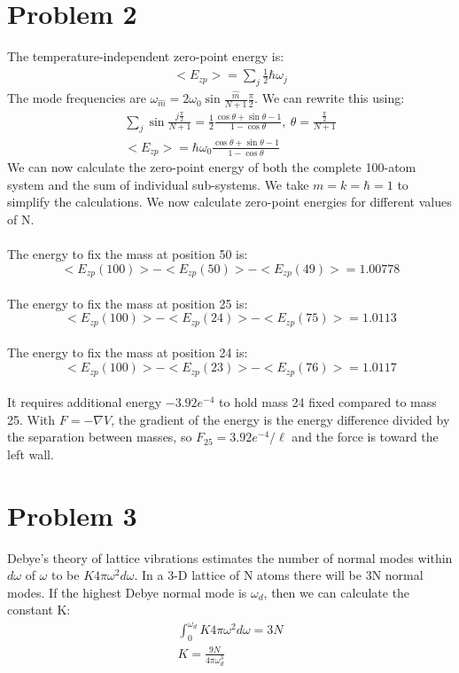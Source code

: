 \documentclass[a4paper,10pt]{article}
\numberwithin{equation}{section}
\begin{document}
\section{Problem 2}
The temperature-independent zero-point energy is:
\begin{gather}
  <E_{zp}>=\sum_j \frac{1}{2}\hbar \omega_j
\end{gather}
The mode frequencies are $\omega_{\hat{m}}=2\omega_0\sin{\frac{\hat{m}}{N+1}\frac{\pi}{2}}$. We can rewrite this using:
\begin{gather}
 \sum_j\sin\frac{j\frac{\pi}{2}}{N+1}=\frac{1}{2}\frac{\cos \theta+\sin \theta-1}{1-\cos \theta},\ \theta=\frac{\frac{\pi}{2}}{N+1}\\
 <E_{zp}>=\hbar\omega_0\frac{\cos \theta+\sin \theta-1}{1-\cos \theta}
\end{gather}
We can now calculate the zero-point energy of both the complete 100-atom system and the sum of individual sub-systems.
We take $m=k=\hbar=1$ to simplify the calculations. We now calculate zero-point energies for different values of N.\\ \\
The energy to fix the mass at position 50 is:
\begin{equation}
 <E_{zp}(100)>-<E_{zp}(50)>-<E_{zp}(49)>=1.00778
\end{equation}
\\
The energy to fix the mass at position 25 is:
\begin{equation}
 <E_{zp}(100)>-<E_{zp}(24)>-<E_{zp}(75)>=1.0113
\end{equation}
\\ 
The energy to fix the mass at position 24 is:
\begin{equation}
 <E_{zp}(100)>-<E_{zp}(23)>-<E_{zp}(76)>=1.0117
\end{equation}
\\
It requires additional energy $-3.92e^{-4}$ to hold mass 24 fixed compared to mass 25. 
With $F=-\nabla V$, the gradient of the energy is the energy difference divided by the separation between masses, so $F_{25}=3.92e^{-4}/\ell$ and the force is toward the left wall.

\section{Problem 3}
Debye's theory of lattice vibrations estimates the number of normal modes within $d\omega$ of $\omega$ to be $K4\pi\omega ^2 d\omega$.
In a 3-D lattice of N atoms there will be 3N normal modes. If the highest Debye normal mode is $\omega_d$, then we can calculate the constant K:
\begin{gather}
 \int_{0}^{\omega_d}K4\pi\omega ^2 d\omega=3N\\
 K=\frac{9N}{4\pi \omega_{d}^{3}}
\end{gather}
\end{document}
